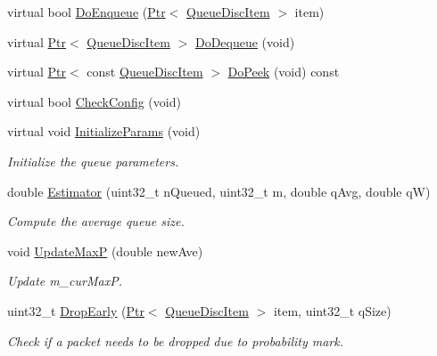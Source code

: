 \begin{DoxyCompactItemize}
\item 
virtual bool \hyperlink{classns3_1_1RedQueueDisc_ae0be138c29bf158336a7a74a90790c2a}{Do\+Enqueue} (\hyperlink{classns3_1_1Ptr}{Ptr}$<$ \hyperlink{classns3_1_1QueueDiscItem}{Queue\+Disc\+Item} $>$ item)
\item 
virtual \hyperlink{classns3_1_1Ptr}{Ptr}$<$ \hyperlink{classns3_1_1QueueDiscItem}{Queue\+Disc\+Item} $>$ \hyperlink{classns3_1_1RedQueueDisc_a166dbfb99b576f2ff6e1d1871b6afb14}{Do\+Dequeue} (void)
\item 
virtual \hyperlink{classns3_1_1Ptr}{Ptr}$<$ const \hyperlink{classns3_1_1QueueDiscItem}{Queue\+Disc\+Item} $>$ \hyperlink{classns3_1_1RedQueueDisc_a351367bffb926ff50712cc269d8e3442}{Do\+Peek} (void) const 
\item 
virtual bool \hyperlink{classns3_1_1RedQueueDisc_a86e75c3ab20213f1451bdc7270d18114}{Check\+Config} (void)
\item 
virtual void \hyperlink{classns3_1_1RedQueueDisc_adac83b0cbf66f22a6176304b3907995e}{Initialize\+Params} (void)
\begin{DoxyCompactList}\small\item\em Initialize the queue parameters. \end{DoxyCompactList}\item 
double \hyperlink{classns3_1_1RedQueueDisc_a980505235ac07d31352bcb1389039a95}{Estimator} (uint32\+\_\+t n\+Queued, uint32\+\_\+t m, double q\+Avg, double qW)
\begin{DoxyCompactList}\small\item\em Compute the average queue size. \end{DoxyCompactList}\item 
void \hyperlink{classns3_1_1RedQueueDisc_ab4c71cfc5918817468028c99d0c6e456}{Update\+MaxP} (double new\+Ave)
\begin{DoxyCompactList}\small\item\em Update m\+\_\+cur\+MaxP. \end{DoxyCompactList}\item 
uint32\+\_\+t \hyperlink{classns3_1_1RedQueueDisc_a8cf68bf93f0ad885f92e32c8269d33d3}{Drop\+Early} (\hyperlink{classns3_1_1Ptr}{Ptr}$<$ \hyperlink{classns3_1_1QueueDiscItem}{Queue\+Disc\+Item} $>$ item, uint32\+\_\+t q\+Size)
\begin{DoxyCompactList}\small\item\em Check if a packet needs to be dropped due to probability mark. \end{DoxyCompactList}\item 

\end{DoxyCompactItemize}
